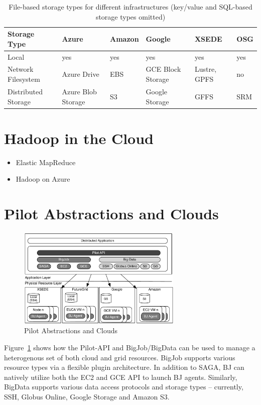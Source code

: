 \documentclass[times]{cpeauth}
\begin{document}
\begin{table}[t]
\centering
\begin{tabular}{|p{2cm}|p{1.2cm}|p{1.2cm}|p{1.2cm}|p{1.2cm}|p{1.2cm}|}
	\hline
	\textbf{Storage Type} &\textbf{Azure} &\textbf{Amazon} &\textbf{Google} &\textbf{XSEDE}  &\textbf{OSG} \\
	\hline
	Local	&yes &yes &yes &yes &yes\\
	\hline
	Network Filesystem &Azure Drive &EBS &GCE Block Storage &Lustre, GPFS 
	&no\\
	\hline
	Distributed Storage &Azure Blob Storage &S3 &Google Storage &GFFS
	 &SRM\\
	\hline	
\end{tabular}
\caption{File-based storage types for different infrastructures (key/value and 
SQL-based storage types omitted) \label{tab:storage-systems}}
\end{table}

\section{Hadoop in the Cloud}

\begin{itemize}
	\item Elastic MapReduce
	\item Hadoop on Azure
\end{itemize}

\section{Pilot Abstractions and Clouds}


\begin{figure}[t]
	\centering
		\includegraphics[width=0.7\textwidth]{figures/cloud_pilot_job.pdf}
	\caption{Pilot Abstractions and Clouds}
	\label{fig:figures_cloud_pilot_job}
\end{figure}
Figure~\ref{fig:figures_cloud_pilot_job} shows how the Pilot-API and 
BigJob/BigData can be used to manage a heterogenous set of both cloud and grid 
resources. BigJob supports various resource types via a flexible plugin 
architecture. In addition to SAGA, BJ can natively utilize both the EC2 and 
GCE API to launch BJ agents. Similarly, BigData supports various data access
protocols and storage types -- currently, SSH, Globus Online, Google Storage
and Amazon S3.
\end{document}
